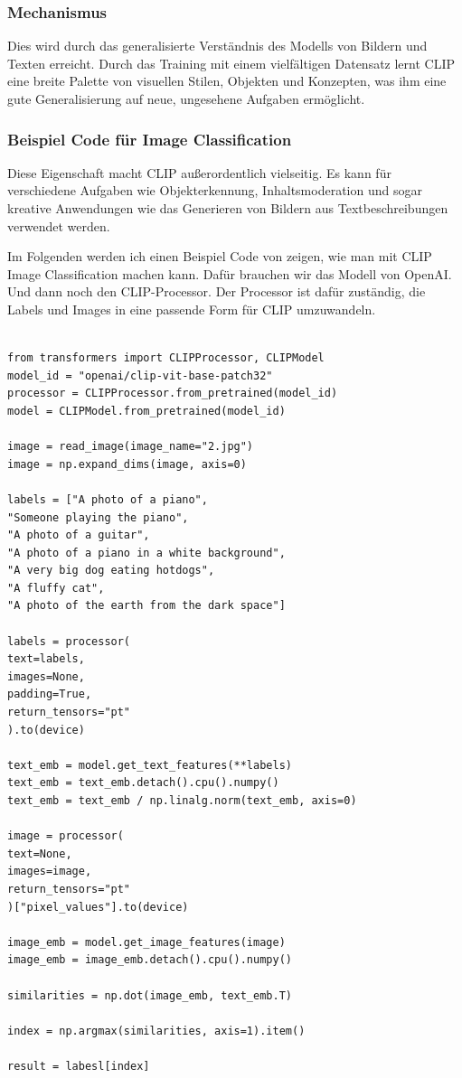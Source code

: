 \documentclass[nolibertine, ngerman, algorithm, nomencl, minted]{ttlab-qualify}
\begin{document}
\subsubsection{Mechanismus}
Dies wird durch das generalisierte Verständnis des Modells von Bildern und Texten 
erreicht. Durch das Training mit einem vielfältigen Datensatz lernt CLIP eine breite 
Palette von visuellen Stilen, Objekten und Konzepten, was ihm eine gute Generalisierung 
auf neue, ungesehene Aufgaben ermöglicht.

\subsubsection{Beispiel Code für Image Classification}
Diese Eigenschaft macht CLIP außerordentlich vielseitig. Es kann für verschiedene 
Aufgaben wie Objekterkennung, Inhaltsmoderation und sogar kreative Anwendungen wie 
das Generieren von Bildern aus Textbeschreibungen verwendet werden.

Im Folgenden werden ich einen Beispiel Code von \textcite{pinecone2023zeroshot} zeigen, wie man mit CLIP Image Classification machen kann.
Dafür brauchen wir das Modell von OpenAI. Und dann noch den CLIP-Processor.
Der Processor ist dafür zuständig, die Labels und Images in eine passende Form für CLIP umzuwandeln.

\begin{verbatim}

from transformers import CLIPProcessor, CLIPModel
model_id = "openai/clip-vit-base-patch32"
processor = CLIPProcessor.from_pretrained(model_id)
model = CLIPModel.from_pretrained(model_id)

image = read_image(image_name="2.jpg")
image = np.expand_dims(image, axis=0)

labels = ["A photo of a piano", 
"Someone playing the piano", 
"A photo of a guitar", 
"A photo of a piano in a white background",
"A very big dog eating hotdogs", 
"A fluffy cat", 
"A photo of the earth from the dark space"]

labels = processor(
text=labels,
images=None,
padding=True,
return_tensors="pt"
).to(device)

text_emb = model.get_text_features(**labels)
text_emb = text_emb.detach().cpu().numpy()
text_emb = text_emb / np.linalg.norm(text_emb, axis=0)

image = processor(
text=None,
images=image,
return_tensors="pt"
)["pixel_values"].to(device)

image_emb = model.get_image_features(image)
image_emb = image_emb.detach().cpu().numpy()

similarities = np.dot(image_emb, text_emb.T)

index = np.argmax(similarities, axis=1).item()

result = labesl[index]
\end{verbatim}
\end{document}
